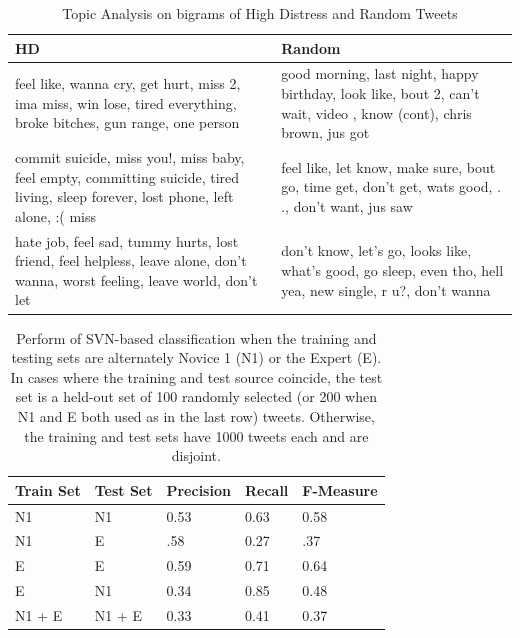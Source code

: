 \documentclass[11pt]{article}
\begin{document}
\begin{table}[h]
\tiny
\centering
\begin{tabular}{|>{\centering\arraybackslash}m{1.2in}| >{\centering\arraybackslash}m{1.2in}|}
\hline
HD & Random \\ \hline
feel like, wanna cry, get hurt, miss 2, ima miss, win lose, tired everything, broke bitches, gun range, one person & good morning, last night, happy birthday, look like, bout 2, can't wait, video , know (cont), chris brown, jus got \\ \hline
commit suicide, miss you!, miss baby, feel empty, committing suicide, tired living, sleep forever, lost phone, left alone, :( miss & feel like, let know, make sure, bout go, time get, don't get, wats good, . ., don't want, jus saw \\ \hline
hate job, feel sad, tummy hurts, lost friend, feel helpless, leave alone, don't wanna, worst feeling, leave world, don't let & don't know, let's go, looks like, what's good, go sleep, even tho, hell yea, new single, r u?, don't wanna \\ \hline
\end{tabular}
\caption{Topic Analysis on bigrams of High Distress and Random Tweets }
\label{tab:tm}
\end{table}


\begin{table}[h]
\small
\begin{tabular}{|l|l|l|l|l|}
\hline
Train Set         & Test Set          & Precision & Recall & F-Measure \\ \hline
N1          & N1          & 0.53      & 0.63   & 0.58      \\ \hline
N1          & E & .58       & 0.27   & .37       \\ \hline
E           & E     & 0.59      & 0.71   & 0.64      \\ \hline
E            & N1          & 0.34      & 0.85   & 0.48      \\ \hline
N1 + E & N1 + E & 0.33      & 0.41   &  0.37         \\ \hline
\end{tabular}
\caption{Perform of SVN-based classification when the training and testing sets are alternately Novice 1 (N1) or the Expert (E). In cases where the training and test source coincide, the test set is a held-out set of 100 randomly selected (or 200 when N1 and E both used as in the last row) tweets. Otherwise, the training and test sets have 1000 tweets each and are disjoint.}
\end{table}
\end{document}
